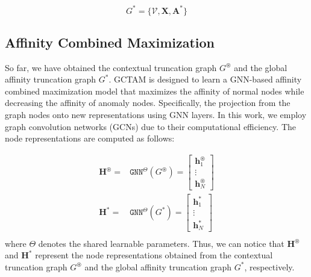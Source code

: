 \documentclass{article}
\begin{document}
\begin{equation}
G^{*} = \{\mathcal{V}, \mathbf{X}, \mathbf{A}^*\}
\label{eq: global affinity graph}
\end{equation}



\subsection{Affinity Combined Maximization}
So far, we have obtained the contextual truncation graph $G^{\circledast}$ and the global affinity truncation graph $G^{*}$. GCTAM is designed to learn a GNN-based affinity combined maximization model that maximizes the affinity of normal nodes while decreasing the affinity of anomaly nodes. Specifically, the projection from the graph nodes onto new representations using GNN layers. In this work, we employ graph convolution networks (GCNs) \cite{kipf2016gcn} due to their computational efficiency. The node representations are computed as follows:

\begin{equation}
\begin{aligned}
    \mathbf{H}^{\circledast} =& \mathtt{GNN}^{\Theta}(G^{\circledast}) = \left[\begin{matrix}\mathbf{h}^{\circledast}_{1}\\\vdots\\ \mathbf{h}^{\circledast}_{N}\end{matrix}\right] \\
    \mathbf{H}^{*} =& \mathtt{GNN}^{\Theta}(G^{*}) = \left[\begin{matrix}\mathbf{h}^{*}_{1}\\\vdots\\ \mathbf{h}^{*}_{N}\end{matrix}\right] \\
\end{aligned}
\label{eq: gnn}
\end{equation}
where $\Theta$ denotes the shared learnable parameters. Thus, we can notice that $\mathbf{H}^{\circledast}$ and $\mathbf{H}^{*}$ represent the node representations obtained from the contextual truncation graph $G^{\circledast}$ and the global affinity truncation graph $G^{*}$, respectively. 
\end{document}
